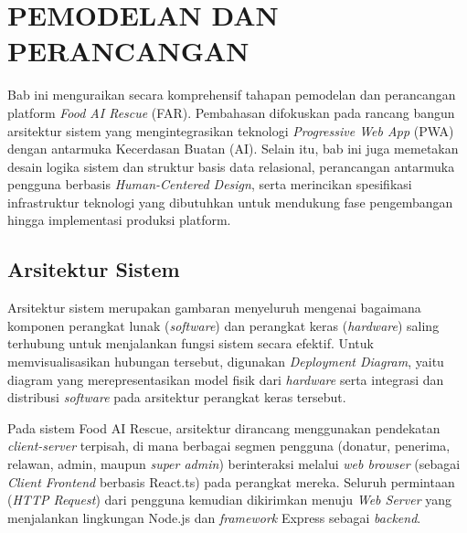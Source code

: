 
\chapter{PEMODELAN DAN PERANCANGAN}
\label{chapter:pemodelan-dan-perancangan}

Bab ini menguraikan secara komprehensif tahapan pemodelan dan perancangan platform \textit{Food AI Rescue} (FAR). Pembahasan difokuskan pada rancang bangun arsitektur sistem yang mengintegrasikan teknologi \textit{Progressive Web App} (PWA) dengan antarmuka Kecerdasan Buatan (AI). Selain itu, bab ini juga memetakan desain logika sistem dan struktur basis data relasional, perancangan antarmuka pengguna berbasis \textit{Human-Centered Design}, serta merincikan spesifikasi infrastruktur teknologi yang dibutuhkan untuk mendukung fase pengembangan hingga implementasi produksi platform.

\section{Arsitektur Sistem}

Arsitektur sistem merupakan gambaran menyeluruh mengenai bagaimana komponen perangkat lunak (\textit{software}) dan perangkat keras (\textit{hardware}) saling terhubung untuk menjalankan fungsi sistem secara efektif. Untuk memvisualisasikan hubungan tersebut, digunakan \textit{Deployment Diagram}, yaitu diagram yang merepresentasikan model fisik dari \textit{hardware} serta integrasi dan distribusi \textit{software} pada arsitektur perangkat keras tersebut.

Pada sistem Food AI Rescue, arsitektur dirancang menggunakan pendekatan \textit{client-server} terpisah, di mana berbagai segmen pengguna (donatur, penerima, relawan, admin, maupun \textit{super admin}) berinteraksi melalui \textit{web browser} (sebagai \textit{Client Frontend} berbasis React.ts) pada perangkat mereka. Seluruh permintaan (\textit{HTTP Request}) dari pengguna kemudian dikirimkan menuju \textit{Web Server} yang menjalankan lingkungan Node.js dan \textit{framework} Express sebagai \textit{backend}.

